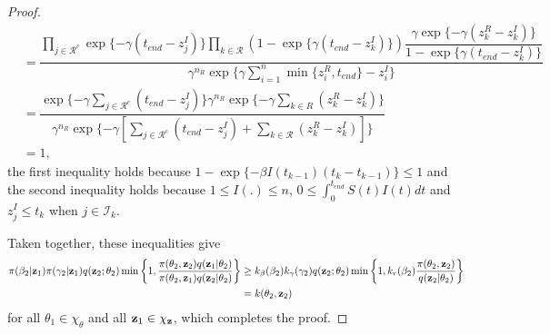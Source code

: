 \documentclass[11pt]{article}
\newtheorem{lemma}{Lemma}[section]
\begin{document}
\begin{proof}
\begin{align*}
        	& = \dfrac{\prod_{j \in \mathcal{R}^c} \exp\{-\gamma(t_{end}-z^I_j)\} \prod_{k \in \mathcal{R}} (1-\exp\{\gamma(t_{end}-z^I_k)\}) \dfrac{\gamma \exp\{-\gamma (z^R_k - z^I_k)\}}{1-\exp\{\gamma(t_{end}-z^I_k)\}} }{\gamma^{n_R} \exp\{ \gamma \sum_{i=1}^n \min\{z^R_i, t_{end}\} - z^I_i\}} \\
        	& = \dfrac{\exp\{-\gamma \sum_{j \in \mathcal{R}^c}(t_{end}-z^I_j)\} \gamma^{n_R} \exp\{-\gamma \sum_{k\in R}(z^R_k - z^I_k)\} }{\gamma^{n_R} \exp\{-\gamma[\sum_{j \in \mathcal{R}^c}(t_{end}-z^I_j) + \sum_{k\in \mathcal{R}}(z^R_k - z^I_k)] \}} \\
        	& = 1,
        \end{align*}
        the first inequality holds because $1-\exp\{-\beta I(t_{k-1})(t_k - t_{k-1})\} \le 1$ and the second inequality holds because $1\le I(.) \le n$,  $0\le\int_0^{t_{end}} S(t)I(t)dt$ and $z^I_j \le t_k$ when $j\in\mathcal{I}_k$.
		
		Taken together, these inequalities give
		\begin{align*}
		\pi(\beta_2 | \mathbf{z}_1) \pi(\gamma_2 | \mathbf{z}_1) q(\mathbf{z}_2; \theta_2) \min\left\lbrace 1, \dfrac{\pi(\theta_2, \mathbf{z}_2)q(\mathbf{z}_1| \theta_2)}{\pi(\theta_2, \mathbf{z}_1)q(\mathbf{z}_2
		|\theta_2)} \right\rbrace
		& \ge k_\beta(\beta_2) k_\gamma(\gamma_2) q(\mathbf{z}_2; \theta_2) \min\left\lbrace 1, k_r(\beta_2) \dfrac{\pi(\theta_2, \mathbf{z}_2)}{q(\mathbf{z}_2|\theta_2)} \right\rbrace \\
		& = k(\theta_2, \mathbf{z}_2)
		\end{align*}
		for all $\theta_1 \in \chi_\theta$ and all $\mathbf{z}_1 \in \chi_{\mathbf{z}}$, which completes the proof.

	\end{proof}
	
	
\end{document}
